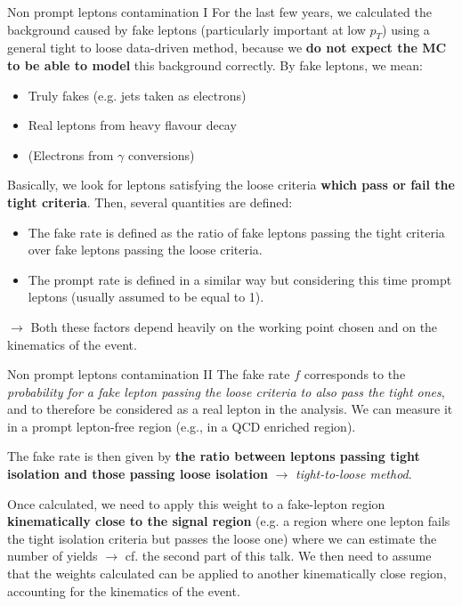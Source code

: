 \documentclass[8pt]{beamer}
\begin{document}
\begin{frame}{Non prompt leptons contamination I}
\justifying
For the last few years, we calculated the background caused by fake leptons (particularly important at low $p_T$) using a general \alert{tight to loose data-driven method}, because we \textbf{do not expect the MC to be able to model} this background correctly. \vfill
By fake leptons, we mean: 
\begin{itemize}
\item Truly fakes (e.g. jets taken as electrons)
\item Real leptons from heavy flavour decay
\item (Electrons from $\gamma$ conversions)
\end{itemize} \vfill
Basically, we look for leptons satisfying the loose criteria \textbf{which pass or fail the tight criteria}. Then, several quantities are defined:
\begin{itemize}
\justifying
\item The \alert{fake rate} is defined as the ratio of fake leptons passing the tight criteria over fake leptons passing the loose criteria. 
\item The \alert{prompt rate} is defined in a similar way but considering this time prompt leptons (usually assumed to be equal to 1).
\end{itemize}
\hspace{10pt} $\rightarrow$ Both these factors depend heavily on the working point chosen and on the kinematics of the event. \vfill
\end{frame}

\begin{frame}{Non prompt leptons contamination II}
\justifying
The \alert{fake rate} $f$ corresponds to the \textit{probability for a fake lepton passing the loose criteria to also pass the tight ones}, and to therefore be considered as a real lepton in the analysis. We can measure it in a prompt lepton-free region (e.g., in a QCD enriched region). \vfill
\begin{center}
The fake rate is then given by \textbf{the ratio between leptons passing tight isolation and those passing loose isolation} $\rightarrow$ \textit{tight-to-loose method}.
\end{center} \vfill
Once calculated, we need to \alert{apply this weight} to a fake-lepton region \textbf{kinematically close to the signal region} (e.g. a region where one lepton fails the tight isolation criteria but passes the loose one) where we can estimate the number of yields $\rightarrow$ cf. the second part of this talk. \vfill
We then need to assume that the weights calculated can be applied to another kinematically close region, accounting for the kinematics of the event. \vfill
\end{frame}
\end{document}
